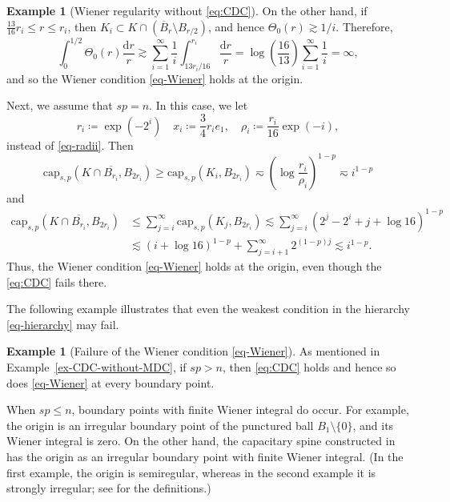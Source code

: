\documentclass[11pt]{amsart}
\theoremstyle{plain}
\theoremstyle{definition}
\newtheorem{example}[theorem]{Example}
\numberwithin{equation}{section}
\begin{document}
\begin{example}[Wiener regularity without \eqref{eq:CDC}]
On the other hand, if $\frac{13}{16}r_i \leq r \leq r_i$, then $K_i \subset K \cap (\overline{B}_r \setminus B_{r/2})$, and hence $\Theta_0(r) \gtrsim 1/i$. Therefore,
\begin{equation*}
\int_0^{1/2} \Theta_0(r) \frac{\mathrm{d}r}{r} \gtrsim \sum_{i=1}^\infty \frac{1}{i} \int_{13r_i/16}^{r_i} \frac{\mathrm{d}r}{r} = \log \left( \frac{16}{13} \right) \sum_{i=1}^\infty \frac{1}{i} = \infty,
\end{equation*}
and so the Wiener condition \eqref{eq-Wiener} holds at the origin.

Next, we assume that $sp=n$. In this case, we let
\begin{equation*}
r_i \coloneqq \exp(-2^{i}) \quad x_i \coloneqq \frac{3}{4} r_i e_1, \quad \rho_i \coloneqq \frac{r_i}{16} \exp(-i),
\end{equation*}
instead of \eqref{eq-radii}. Then
\begin{equation*}
\mathrm{cap}_{s, p}(K \cap \overline{B_{r_i}}, B_{2r_i}) \geq \mathrm{cap}_{s, p}(K_i, B_{2r_i}) \eqsim \left( \log \frac{r_i}{\rho_i} \right)^{1-p} \eqsim i^{1-p}
\end{equation*}
and
\begin{align*}
\mathrm{cap}_{s, p}(K \cap \overline{B_{r_i}}, B_{2r_i})
&\leq \sum_{j=i}^\infty \mathrm{cap}_{s, p}(K_j, B_{2r_i}) \lesssim \sum_{j=i}^\infty \left( 2^j-2^i+j+\log 16 \right)^{1-p} \\
&\lesssim (i+\log 16)^{1-p} + \sum_{j=i+1}^\infty 2^{(1-p)j} \lesssim i^{1-p}.
\end{align*}
Thus, the Wiener condition \eqref{eq-Wiener} holds at the origin, even though the \eqref{eq:CDC} fails there.
\end{example}




The following example illustrates that even the weakest condition in the hierarchy \eqref{eq-hierarchy} may fail.


\begin{example}[Failure of the Wiener condition \eqref{eq-Wiener}]\label{ex-failure-Wiener}
As mentioned in Example~\ref{ex-CDC-without-MDC}, if $sp>n$, then \eqref{eq:CDC} holds and hence so does \eqref{eq-Wiener} at every boundary point.

When $sp \leq n$, boundary points with finite Wiener integral do occur. For example, the origin is an irregular boundary point of the punctured ball $B_1 \setminus \{0\}$, and its Wiener integral is zero. On the other hand, the capacitary spine constructed in \cite[Example~5.11]{BBK25} has the origin as an irregular boundary point with finite Wiener integral. (In the first example, the origin is semiregular, whereas in the second example it is strongly irregular; see \cite{BBK24} for the definitions.)
\end{example}
\end{document}

